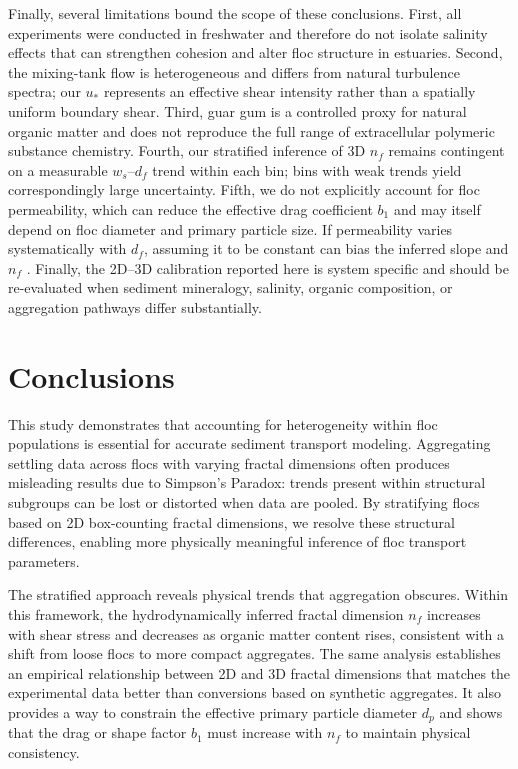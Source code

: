 \documentclass{agujournal2019}
\providecommand{\DIFadd}[1]{{\protect\color{blue}#1}}
\begin{document}
\DIFadd{Finally, several limitations bound the scope of these conclusions. First, all experiments were conducted in freshwater and therefore do not isolate salinity effects that can strengthen cohesion and alter floc structure in estuaries. Second, the mixing-tank flow is heterogeneous and differs from natural turbulence spectra; our $u_\ast$ represents an effective shear intensity rather than a spatially uniform boundary shear. Third, guar gum is a controlled proxy for natural organic matter and does not reproduce the full range of extracellular polymeric substance chemistry. Fourth, our stratified inference of 3D $n_f$ remains contingent on a measurable $w_s$--$d_f$ trend within each bin; bins with weak trends yield correspondingly large uncertainty. Fifth, we do not explicitly account for floc permeability, which can reduce the effective drag coefficient $b_1$ and may itself depend on floc diameter and primary particle size. If permeability varies systematically with $d_f$, assuming it to be constant can bias the inferred slope and $n_f$ \cite{nghiem2024testing}. Finally, the 2D--3D calibration reported here is system specific and should be re-evaluated when sediment mineralogy, salinity, organic composition, or aggregation pathways differ substantially.}

\section{Conclusions}

This study demonstrates that accounting for heterogeneity within floc populations is essential for accurate sediment transport modeling. Aggregating settling data across flocs with varying fractal dimensions often produces misleading results due to Simpson’s Paradox: trends present within structural subgroups can be lost or distorted when data are pooled. By stratifying flocs based on 2D box-counting fractal dimensions, we resolve these structural differences, enabling more physically meaningful inference of floc transport parameters.

The stratified approach reveals physical trends that aggregation obscures. Within this framework, the hydrodynamically inferred fractal dimension \(n_f\) increases with shear stress and decreases as organic matter content rises, consistent with a shift from loose flocs to more compact aggregates. The same analysis establishes an empirical relationship between 2D and 3D fractal dimensions that matches the experimental data better than conversions based on synthetic aggregates. It also provides a way to constrain the effective primary particle diameter \(d_p\) and shows that the drag or shape factor \(b_1\) must increase with \(n_f\) to maintain physical consistency.
\end{document}
